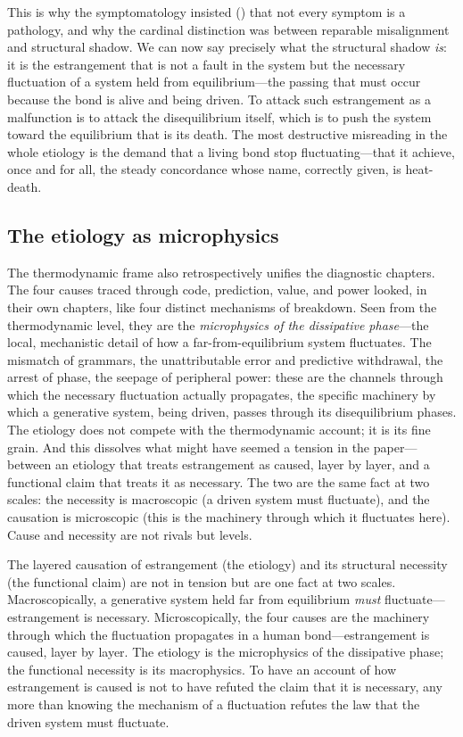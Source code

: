 This is why the symptomatology insisted () that not every symptom is a pathology, and why the cardinal distinction was between reparable misalignment and structural shadow. We can now say precisely what the structural shadow \emph{is}: it is the estrangement that is not a fault in the system but the necessary fluctuation of a system held from equilibrium---the passing that must occur because the bond is alive and being driven. To attack such estrangement as a malfunction is to attack the disequilibrium itself, which is to push the system toward the equilibrium that is its death. The most destructive misreading in the whole etiology is the demand that a living bond stop fluctuating---that it achieve, once and for all, the steady concordance whose name, correctly given, is heat-death.

\subsection{The etiology as microphysics}
\label{p17:sub:dissipation-microphysics}

The thermodynamic frame also retrospectively unifies the diagnostic chapters. The four causes traced through code, prediction, value, and power looked, in their own chapters, like four distinct mechanisms of breakdown. Seen from the thermodynamic level, they are the \emph{microphysics of the dissipative phase}---the local, mechanistic detail of how a far-from-equilibrium system fluctuates. The mismatch of grammars, the unattributable error and predictive withdrawal, the arrest of phase, the seepage of peripheral power: these are the channels through which the necessary fluctuation actually propagates, the specific machinery by which a generative system, being driven, passes through its disequilibrium phases. The etiology does not compete with the thermodynamic account; it is its fine grain. And this dissolves what might have seemed a tension in the paper---between an etiology that treats estrangement as caused, layer by layer, and a functional claim that treats it as necessary. The two are the same fact at two scales: the necessity is macroscopic (a driven system must fluctuate), and the causation is microscopic (this is the machinery through which it fluctuates here). Cause and necessity are not rivals but levels.

\begin{claim}
The layered causation of estrangement (the etiology) and its structural necessity (the functional claim) are not in tension but are one fact at two scales. Macroscopically, a generative system held far from equilibrium \emph{must} fluctuate---estrangement is necessary. Microscopically, the four causes are the machinery through which the fluctuation propagates in a human bond---estrangement is caused, layer by layer. The etiology is the microphysics of the dissipative phase; the functional necessity is its macrophysics. To have an account of how estrangement is caused is not to have refuted the claim that it is necessary, any more than knowing the mechanism of a fluctuation refutes the law that the driven system must fluctuate.
\end{claim}

